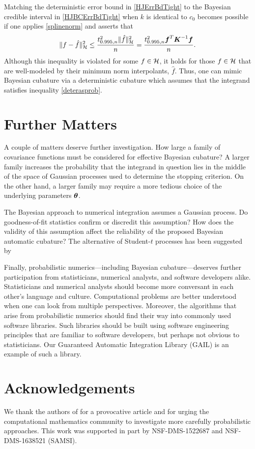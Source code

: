\documentclass[sts]{imsart}
\numberwithin{equation}{section}
\theoremstyle{plain}
\newcommand{\calH}{\mathcal{H}}
\newcommand{\BOGOS}{\citetalias{BriEtal18a}}%
\begin{document}
Matching the deterministic error bound in \eqref{HJErrBdTight} to the Bayesian credible interval in  \eqref{HJBCErrBdTight} when  $k$ is identical to $c_0$ becomes possible if one applies \eqref{splinenorm} and asserts that 
\begin{equation}
\label{deterasprob}
\lVert f - \hat{f} \rVert_{\calH}^2 \le \frac{ t_{0.995,n}^2 \lVert \hat{f} \rVert^2_{\calH}}{n} = \frac{t_{0.995,n}^2 \vf^T \vK^{-1} \vf}{n}.
\end{equation}
Although this inequality is violated for some $f \in \mathcal{H}$, it holds for those $f \in \mathcal{H}$ that are well-modeled by their minimum norm interpolants, $\hat{f}$.  Thus, one can mimic Bayesian cubature via a deterministic cubature which assumes that the integrand satisfies inequality \eqref{deterasprob}.


\section{Further Matters}

A couple of matters deserve further investigation.  How large a family of covariance functions must be considered for effective Bayesian cubature?  A larger family increases the probability that the integrand in question lies in the middle of the space of Gaussian processes used to determine the stopping criterion.  On the other hand, a larger family may require a more tedious choice of the underlying parameters $\boldsymbol{\theta}$.

The Bayesian approach to numerical integration assumes a Gaussian process.  Do goodness-of-fit statistics confirm or discredit this assumption?  How does the validity of this assumption affect the reliability of the proposed Bayesian automatic cubature?  The alternative of Student-$t$ processes has been suggested by \cite{ShaWilGha14a}

Finally, probabilistic numerics---including Bayesian cubature---deserves further participation from statisticians, numerical analysts, and software developers alike.  Statisticians and numerical analysts should become more conversant in each other's language and culture.  Computational problems are better understood when one can look from multiple perspectives.  Moreover, the algorithms that arise from probabilistic numerics should find their way into commonly used software libraries.  Such libraries should be built using  software engineering principles that are familiar to software developers, but perhaps not obvious to statisticians. Our Guaranteed Automatic Integration Library (GAIL) \cite{ChoEtal17b} is an example of such a library.




\section*{Acknowledgements}
We thank the authors of \BOGOS{} for a provocative article and for urging the computational mathematics community to investigate more carefully probabilistic approaches.  This work was supported in part by NSF-DMS-1522687 and NSF-DMS-1638521 (SAMSI).



\end{document}
